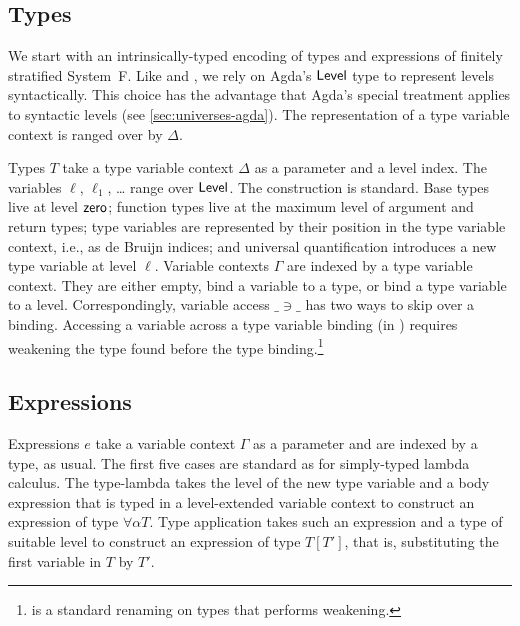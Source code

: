 \documentclass[manuscript,screen,review,anonymous]{acmart}
\begin{document}
{\subsection{Types}
\label{sec:syntax-types}

We start with an intrinsically-typed encoding of types and expressions
of finitely stratified System~F. Like
\citet{DBLP:conf/tyde/Saffrich0W24} and
\citet{DBLP:journals/pacmpl/HubersM23}, we rely on Agda's $\ALevel$
type to represent levels syntactically. This choice has the advantage
that Agda's special treatment applies to syntactic levels (see
\ref{sec:universes-agda}). The representation of a type variable
context is {\SFTEnv} ranged over by $\Delta$.

Types $T$ take a type variable context $\Delta$ as a parameter and a level
index. The variables $\ell$, $\ell_1$, \dots{} range over
$\ALevel$. The construction is standard. Base types live at level
$\ASetzero$; function types live at the maximum level of argument and
return types; type variables are
represented by their position in the type variable context, i.e.,
as de Bruijn indices; and
universal quantification introduces a new type variable at level $\ell$.
\SFType
Variable contexts $\Gamma$ are indexed by a type variable context. They
are either empty, bind a variable to a type, or bind a type variable
to a level. Correspondingly, variable access $\_\ni\_$ has two ways to
skip over a binding. Accessing a variable across a type variable
binding (in \Atskip) requires weakening the type found before the type
binding.\footnote{{\ATwk} is a standard renaming on types that
  performs weakening.}

\begin{minipage}{0.45\linewidth}
  \SFEEnv
\end{minipage}
\begin{minipage}{0.45\linewidth}
  \SFEEnvNi
\end{minipage}

\subsection{Expressions}
\label{sec:syntax-expressions}


Expressions $e$ take a variable context $\Gamma$ as a parameter and are indexed
by a type, as usual. The first five cases are standard as for
simply-typed lambda calculus. The type-lambda takes the level of the
new type variable and a body expression that is typed in a
level-extended variable context to construct an expression of type
$\forall\alpha T$. Type application takes such an expression and a
type of suitable level to construct an expression of type $T[T']$,
that is, substituting the first variable in $T$ by $T'$.

}
\end{document}
